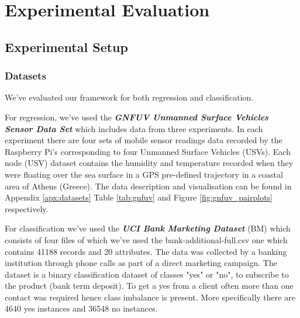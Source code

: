 \documentclass{mpaper}
\begin{document}
\section{Experimental Evaluation}

\subsection{Experimental Setup}

\subsubsection{Datasets}\label{chap:training_data}

We've evaluated our framework for both regression and classification. 

For regression, we've used the \textbf{\textit{GNFUV Unmanned Surface Vehicles Sensor Data Set}} \cite{GNFUV} which includes data from three experiments. In each experiment there are four sets of mobile sensor readings data recorded by the Raspberry Pi's corresponding to four Unmanned Surface Vehicles (USVs). Each node (USV) dataset contains the humidity and temperature recorded when they were floating over the sea surface in a GPS pre-defined trajectory in a coastal area of Athens (Greece). The data description and visualisation can be found in Appendix \ref{apx:datasets} Table \ref{tab:gnfuv} and Figure \ref{fig:gnfuv_pairplots} respectively. 

For classification we've used the \textbf{\textit{UCI Bank Marketing Dataset}} (BM) \cite{BMDataset} which consists of four files of which we've used the bank-additional-full.csv one which contains 41188 records and 20 attributes. The data was collected by a banking institution through phone calls as part of a direct marketing campaign. The dataset is a binary classification dataset of classes "yes" or "no", to subscribe to the product (bank term deposit). To get a yes from a client often more than one contact was required hence class imbalance is present. More specifically there are 4640 yes instances and 36548 no instances. 
\end{document}
